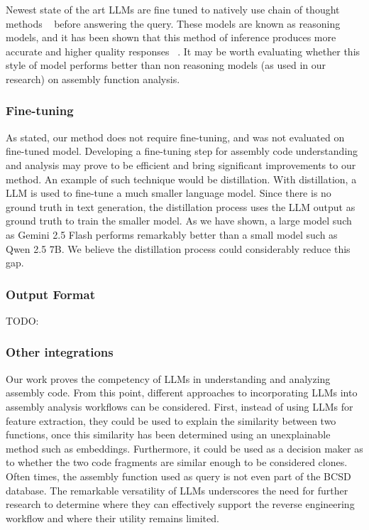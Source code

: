 Newest state of the art LLMs are fine tuned to natively use chain of thought methods ~\cite{c-o-t} before answering the query.
These models are known as reasoning models, and it has been shown that this method of inference produces more accurate and
higher quality responses ~\cite{c-o-t,reasoning,thinking-llm}. It may be worth evaluating whether this style of model performs better than
non reasoning models (as used in our research) on assembly function analysis.

\subsubsection{Fine-tuning}

As stated, our method does not require fine-tuning, and was not evaluated on fine-tuned model. Developing a fine-tuning step
for assembly code understanding and analysis may prove to be efficient and bring significant improvements to our method.
An example of such technique would be distillation. With distillation, a LLM is used to fine-tune a much smaller language
model. Since there is no ground truth in text generation, the distillation process uses the LLM output as ground truth
to train the smaller model. As we have shown, a large model such as Gemini 2.5 Flash performs remarkably better than a
small model such as Qwen 2.5 7B. We believe the distillation process could considerably reduce this gap.

\subsubsection{Output Format}

TODO: 

\subsubsection{Other integrations}

Our work proves the competency of LLMs in understanding and analyzing assembly code. From this point, different approaches
to incorporating LLMs into assembly analysis workflows can be considered. First, instead of using LLMs for feature extraction,
they could be used to explain the similarity between two functions, once this similarity has been determined using an unexplainable
method such as embeddings. Furthermore, it could be used as a decision maker as to whether the two code fragments are similar enough
to be considered clones. Often times, the assembly function used as query is not even part of the BCSD database. The remarkable versatility
of LLMs underscores the need for further research to determine where they can effectively support the reverse engineering workflow and where
their utility remains limited.

